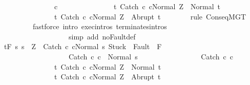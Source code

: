 \begin{isabellebody}
\ \ \ \ \ \ \ \ \ \ \ \ \ \ \ c\isanewline
\ \ \ \ \ \ \ \ \ \ \ \ \ \ \ {\isacharbraceleft}t{\isachardot}\ {\isasymGamma}{\isasymturnstile}{\isasymlangle}Catch\ c\ cNormal\ Z{\isasymrangle}\ {\isasymRightarrow}\ Normal\ t{\isacharbraceright}{\isacharcomma}\isanewline
\ \ \ \ \ \ \ \ \ \ \ \ \ \ \ {\isacharbraceleft}t{\isachardot}\ {\isasymGamma}{\isasymturnstile}{\isasymlangle}Catch\ c\ cNormal\ Z{\isasymrangle}\ {\isasymRightarrow}\ Abrupt\ t{\isacharbraceright}{\isachardoublequoteclose}\isanewline
\ \ \ \ \ \ \isamarkupfalse%
\ {\isacharparenleft}rule\ ConseqMGT{\isacharparenright}\isanewline
\ \ \ \ \ \ \ \ \ {\isacharparenleft}fastforce\ intro{\isacharcolon}\ exec{\isachardot}intros\ terminates{\isachardot}intros\ \isanewline
\ \ \ \ \ \ \ \ \ \ \ \ \ \ \ \ \ \ \ simp\ add{\isacharcolon}\ noFault{\isacharunderscore}def{\isacharprime}{\isacharparenright}\isanewline
\ \ \isamarkupfalse%
\isanewline
\ \ \isamarkupfalse%
\ {\isachardoublequoteopen}{\isasymGamma}{\isacharcomma}{\isasymTheta}{\isasymturnstile}\isactrlsub t\isactrlbsub {\isacharslash}F\isactrlesub \ {\isacharbraceleft}s{\isachardot}\ s\ {\isacharequal}\ Z\ {\isasymand}\ {\isasymGamma}{\isasymturnstile}{\isasymlangle}Catch\ c\ cNormal\ s{\isasymrangle}\ {\isasymRightarrow}{\isasymnotin}{\isacharparenleft}{\isacharbraceleft}Stuck{\isacharbraceright}\ {\isasymunion}\ Fault\ {\isacharbackquote}\ {\isacharparenleft}{\isacharminus}F{\isacharparenright}{\isacharparenright}\ {\isasymand}\ \isanewline
\ \ \ \ \ \ \ \ \ \ \ \ \ \ \ \ \ \ \ {\isasymGamma}{\isasymturnstile}Catch\ c\ c\ {\isasymdown}\ Normal\ s{\isacharbraceright}\ \isanewline
\ \ \ \ \ \ \ \ \ \ \ \ \ \ \ \ Catch\ c\ c\isanewline
\ \ \ \ \ \ \ \ \ \ \ \ \ \ \ {\isacharbraceleft}t{\isachardot}\ {\isasymGamma}{\isasymturnstile}{\isasymlangle}Catch\ c\ cNormal\ Z{\isasymrangle}\ {\isasymRightarrow}\ Normal\ t{\isacharbraceright}{\isacharcomma}\isanewline
\ \ \ \ \ \ \ \ \ \ \ \ \ \ \ {\isacharbraceleft}t{\isachardot}\ {\isasymGamma}{\isasymturnstile}{\isasymlangle}Catch\ c\ cNormal\ Z{\isasymrangle}\ {\isasymRightarrow}\ Abrupt\ t{\isacharbraceright}{\isachardoublequoteclose}\isanewline

\end{isabellebody}
